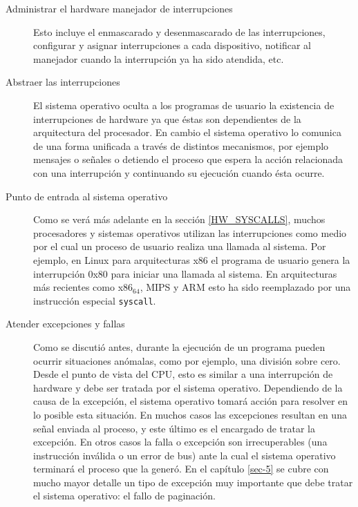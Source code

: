 \documentclass[11pt,fleqn]{book} %
\begin{document}
\begin{description}
\item[Administrar el hardware manejador de interrupciones] Esto incluye el enmascarado y desenmascarado 
                                  de las interrupciones, configurar y asignar
                                  interrupciones a cada dispositivo, 
                                  notificar al manejador cuando la interrupción
                                  ya ha sido atendida, etc.
\item[Abstraer las interrupciones] El sistema operativo oculta a los programas de
                                  usuario la existencia de interrupciones de
                                  hardware ya que éstas son dependientes de la
                                  arquitectura del procesador. En cambio el
                                  sistema operativo lo comunica de una forma
                                  unificada a través de distintos mecanismos,
                                  por ejemplo mensajes o señales o detiendo el
                                  proceso que espera la acción relacionada con
                                  una interrupción y continuando su ejecución
                                  cuando ésta ocurre.
\item[Punto de entrada al sistema operativo] Como se verá más adelante en la 
                                sección \ref{HW_SYSCALLS}, muchos procesadores y
                                sistemas operativos utilizan las interrupciones
                                como medio por el cual un proceso de usuario
                                realiza una llamada al sistema.
                                Por ejemplo, en Linux para arquitecturas x86
                                el programa de usuario genera la interrupción
                                0x80 para iniciar una llamada al sistema.
                                En arquitecturas más recientes como x86$_{\mathrm{64}}$,
                                MIPS y ARM esto ha sido reemplazado por una
                                instrucción especial \texttt{syscall}.
\item[Atender excepciones y fallas] Como se discutió antes, durante la
     ejecución de un programa pueden ocurrir situaciones anómalas, 
     como por ejemplo, una división sobre cero. Desde el punto de
     vista del CPU, esto es similar a una interrupción de hardware y
     debe ser tratada por el sistema operativo. Dependiendo de la
     causa de la excepción, el sistema operativo tomará acción para
     resolver en lo posible esta situación. En muchos casos las
     excepciones resultan en una señal enviada al proceso, y este
     último es el encargado de tratar la excepción. En otros casos la
     falla o excepción son irrecuperables (una instrucción inválida o
     un error de bus) ante la cual el sistema operativo terminará el
     proceso que la generó.  En el capítulo \ref{sec-5} se cubre con mucho
     mayor detalle un tipo de excepción muy importante que debe tratar
     el sistema operativo: el fallo de paginación.
\end{description}
\end{document}
